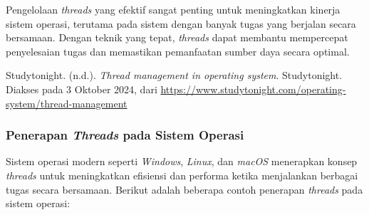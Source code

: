 \documentclass[12pt]{article}
\begin{document}
Pengelolaan \textit{threads} yang efektif sangat penting untuk meningkatkan kinerja sistem operasi, terutama pada sistem dengan banyak tugas yang berjalan secara bersamaan. Dengan teknik yang tepat, \textit{threads} dapat membantu mempercepat penyelesaian tugas dan memastikan pemanfaatan sumber daya secara optimal.

\noindent Studytonight. (n.d.). \textit{Thread management in operating system}. Studytonight. Diakses pada 3 Oktober 2024, 
dari \url{https://www.studytonight.com/operating-system/thread-management}

\subsubsection{Penerapan \textit{Threads} pada Sistem Operasi}
Sistem operasi modern seperti \textit{Windows}, \textit{Linux}, dan \textit{macOS} menerapkan konsep \textit{threads} untuk meningkatkan efisiensi dan performa ketika menjalankan berbagai tugas secara bersamaan. Berikut adalah beberapa contoh penerapan \textit{threads} pada sistem operasi:
\end{document}
